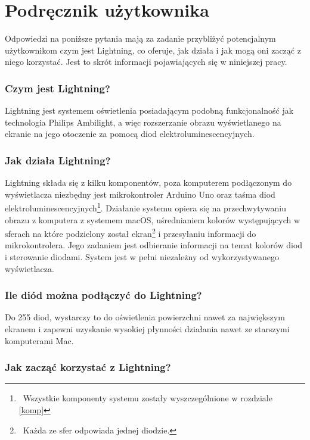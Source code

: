 \documentclass[12pt]{report}
\begin{document}

\section{Podręcznik użytkownika}

Odpowiedzi na poniższe pytania mają za zadanie przybliżyć potencjalnym użytkownikom czym jest Lightning, co oferuje, jak działa i jak mogą oni zacząć z niego korzystać. Jest to skrót informacji pojawiających się w niniejszej pracy.

\subsubsection{Czym jest Lightning?}

Lightning jest systemem oświetlenia posiadającym podobną funkcjonalność jak technologia Philips Ambilight, a więc rozszerzanie obrazu wyświetlanego na ekranie na jego otoczenie za pomocą diod elektroluminescencyjnych.

\subsubsection{Jak działa Lightning?}

Lightning składa się z kilku komponentów, poza komputerem podłączonym do wyświetlacza niezbędny jest mikrokontroler Arduino Uno oraz taśma diod elektroluminescencyjnych\footnote{~Wszystkie komponenty systemu zostały wyszczególnione w rozdziale \ref{komp}}. Działanie systemu opiera się na przechwytywaniu obrazu z komputera z systemem macOS, uśrednianiem kolorów występujących w sferach na które podzielony został ekran\footnote{~Każda ze sfer odpowiada jednej diodzie.} i przesyłaniu informacji do mikrokontrolera. Jego zadaniem jest odbieranie informacji na temat kolorów diod i sterowanie diodami. System jest w pełni niezależny od wykorzystywanego wyświetlacza.

\subsubsection{Ile diód można podłączyć do Lightning?}

Do 255 diod, wystarczy to do oświetlenia powierzchni nawet za największym ekranem i zapewni uzyskanie wysokiej płynności działania nawet ze starszymi komputerami Mac.

\subsubsection{Jak zacząć korzystać z Lightning?}
\end{document}
